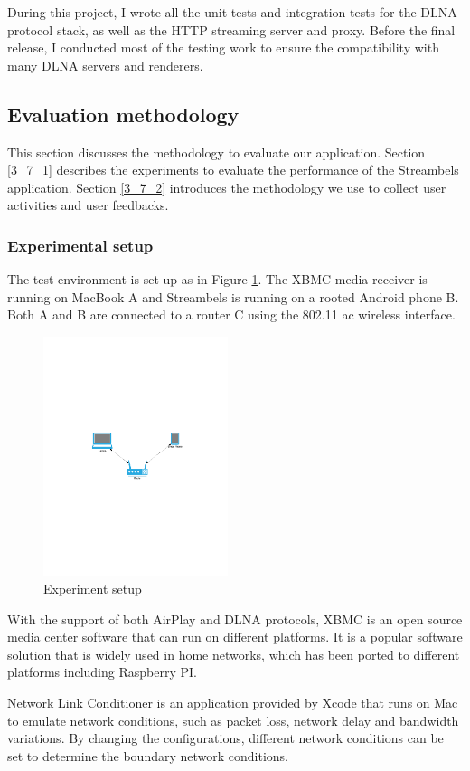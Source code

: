 During this project, I wrote all the unit tests and integration tests for the
DLNA protocol stack, as well as the HTTP streaming server and proxy. Before the
final release, I conducted most of the testing work to ensure the compatibility
with many DLNA servers and renderers.

\subsection{Evaluation methodology\label{3_7}}
This section discusses the methodology to evaluate our application. Section
\ref{3_7_1} describes the experiments to evaluate the performance of
the Streambels application. Section \ref{3_7_2} introduces the methodology we
use to collect user activities and user feedbacks.

\subsubsection{Experimental setup\label{3_7_1}}
The test environment is set up as in Figure \ref{setup}. The XBMC
media receiver is running on MacBook A and Streambels is running on a rooted
Android phone B. Both A and B are connected to a router C using the 802.11 ac
wireless interface. \\
\begin{figure}[htb]
\centering \includegraphics[height=7cm]{charts/experiment_setup}
\caption{Experiment setup \label{setup}}
\end{figure}
With the support of both AirPlay and DLNA protocols, XBMC is an open source
media center software that can run on different platforms. It is a popular
software solution that is widely used in home networks, which has been ported
to different platforms including Raspberry PI.

Network Link Conditioner is an application provided by Xcode that runs on Mac
to emulate network conditions, such as packet loss, network delay and bandwidth
variations. By changing the configurations, different network conditions can be
set to determine the boundary network conditions.

